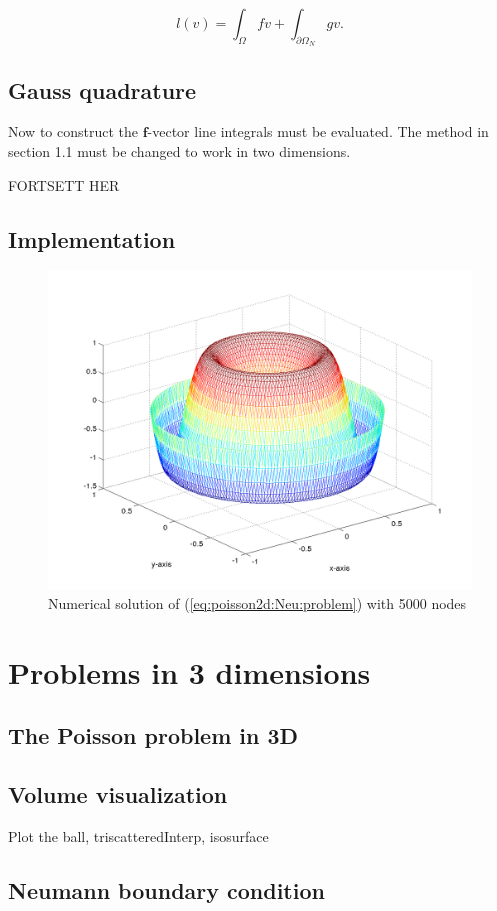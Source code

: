 \documentclass[paper=a4, fontsize=11pt]{scrartcl} %
\begin{document}
\[l(v)=\int_{\Omega} f v  +  \int_{\partial\Omega_N} \! g v.\]
\subsection{Gauss quadrature}
Now to construct the $\mathbf{f}$-vector line integrals must be evaluated. The method in section 1.1 must be changed to work in two dimensions.

FORTSETT HER

\subsection{Implementation}
\begin{figure}[!htb]
  \includegraphics[width=\linewidth]{3d5000.png}
  \caption{Numerical solution of (\ref{eq:poisson2d:Neu:problem}) with 5000 nodes}\label{fig:3d5000}
\end{figure}
\section{Problems in 3 dimensions}
\subsection{The Poisson problem in 3D}
\subsection{Volume visualization}
Plot the ball, triscatteredInterp, isosurface 
\subsection{Neumann boundary condition}
\end{document}
